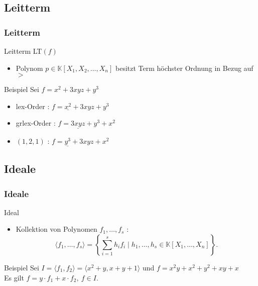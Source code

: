 \documentclass{beamer}
\begin{document}
\subsection{Leitterm}


\begin{frame}[fragile]
\frametitle{Leitterm}

\begin{block}{Leitterm \textsc{LT}$(f)$ }
\begin{itemize}
\item Polynom $p \in  \mathbb{K} \left[X_{1},X_{2},\dots, X_{n}\right] $  besitzt Term höchster Ordnung in Bezug auf $>$
\end{itemize}

\end{block}


\begin{block}{Beispiel}
Sei $f = x^{2}+3xyz+y^{3} $
\begin{itemize}

\item lex-Order : $f = \underline{x^{2}} + 3xyz + y^{3}  $
\item grlex-Order :  $f = \underline{3xyz} + y^{3} + x^{2}  $
\item $\left(1,2,1\right)$ :  $f = \underline{y^{3}} + 3xyz + x^{2}  $
\end{itemize}

\end{block}


\end{frame}
\subsection{Ideale}

\begin{frame}[fragile]
\frametitle{Ideale}

\begin{block}{Ideal }
\begin{itemize}
\item Kollektion von Polynomen $f_{1}, \dots , f_{s}$ : \\
\[ \langle f_{1}, \dots , f_{s} \rangle = \left\lbrace  \sum_{i=1}^s h_{i}f_{i} \mid h_{1}, \dots , h_{s} \in \mathbb{K}\left[X_{1}, \dots, X_{n}\right] \right\rbrace. \] 
 
\end{itemize}

\end{block}

\begin{block}{Beispiel}
Sei $ I= \langle f_{1},f_{2} \rangle = \langle x^{2}+y, x+y+1 \rangle $ und $f=x^{2}y+x^{2}+y^{2}+xy+x$ \\
Es gilt $f= y \cdot f_{1} + x \cdot f_{2},~f\in I$.

\end{block}


\end{frame}
\end{document}
